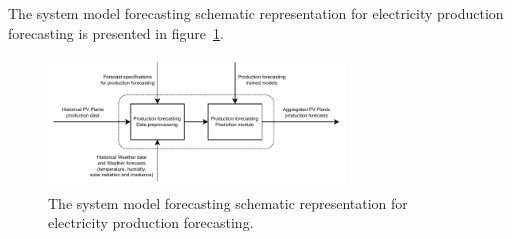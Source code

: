 The system model forecasting schematic representation for electricity production forecasting is presented in figure~\ref{fig:modelforecastingproduction}.

\begin{figure}[H]
\centering
\includegraphics[width=0.7\textwidth]{images/system_model_forecasting_production}
\caption{The system model forecasting schematic representation for electricity production forecasting.}
\label{fig:modelforecastingproduction}
\end{figure}
